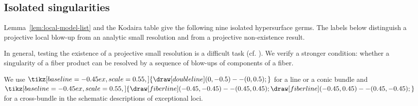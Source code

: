\documentclass[a4paper]{amsart}
\theoremstyle{plain}
\theoremstyle{definition}
\theoremstyle{remark}
\numberwithin{equation}{section}
\newcommand{\fibericon}[2][]{%
  \tikz[baseline=-0.45ex,scale=0.55,#1]{#2}%
}
\newcommand{\DoublePone}{%
  \fibericon{ \draw[doubleline] (0,-0.5) -- (0,0.5); }%
}
\newcommand{\Cross}{%
  \fibericon{%
    \draw[fiberline] (-0.45,-0.45) -- (0.45,0.45);
    \draw[fiberline] (-0.45,0.45) -- (0.45,-0.45);
  }%
}
\begin{document}
\subsection{Isolated singularities}
Lemma~\ref{lem:local-model-list} and the Kodaira table give the following
nine isolated hypersurface germs.  The labels below distinguish a projective
local blow-up from an analytic small resolution and from a projective
non-existence result.

In general, testing the existence of a projective small resolution is a difficult task (cf. \cite[Satz, p. 95]{Werner}). We verify a stronger condition: whether a singularity of a fiber product can be resolved by a sequence of blow-ups of components of a fiber.

We use $\DoublePone$ for a line or a conic bundle and $\Cross$ for a
cross-bundle in the schematic descriptions of exceptional loci.
\end{document}
